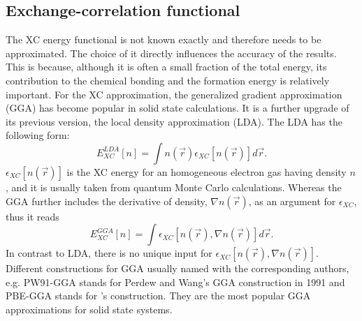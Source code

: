 \subsection{Exchange-correlation functional}
The XC energy functional is not known exactly and therefore needs to be approximated. The choice of it directly influences the accuracy of the results. This is because, although it is often a small fraction of the total energy, its contribution to the chemical bonding and the formation energy is relatively important. For the XC approximation, the generalized gradient approximation (GGA) has become popular in solid state calculations. It is a further upgrade of its previous version, the local density approximation (LDA). The LDA has the following form:
\begin{equation}
E_{XC}^{LDA}[n]=\int n(\vec{r})\epsilon_{XC}[n(\vec{r})]d\vec{r}.
\end{equation}
$\epsilon_{XC}[n(\vec{r})]$ is the XC energy for an homogeneous electron gas having density $n$, and it is usually taken from quantum Monte Carlo calculations. Whereas the GGA further includes the derivative of density, $\nabla n(\vec{r})$, as an argument for $\epsilon_{XC}$, thus it reads
\begin{equation}
E_{XC}^{GGA}[n]=\int \epsilon_{XC}[n(\vec{r}),\nabla n(\vec{r})]d\vec{r}.
\end{equation}
In contrast to LDA, there is no unique input for $\epsilon_{XC}[n(\vec{r}),\nabla n(\vec{r})]$. Different constructions for GGA usually named with the corresponding authors, e.g. PW91-GGA stands for Perdew and Wang's GGA construction in 1991\cite{Perdew1991,Perdew1992} and PBE-GGA stands for \citet{GGA-PBE2}'s construction. They are the most popular GGA approximations for solid state systems. 
